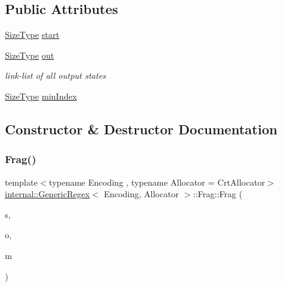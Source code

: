 \subsection*{Public Attributes}
\begin{DoxyCompactItemize}
\item 
\hyperlink{rapidjson_8h_a5ed6e6e67250fadbd041127e6386dcb5}{Size\+Type} \hyperlink{structinternal_1_1GenericRegex_1_1Frag_adec8170ccdf14bfc3138a4df0b2e4abd}{start}
\item 
\hyperlink{rapidjson_8h_a5ed6e6e67250fadbd041127e6386dcb5}{Size\+Type} \hyperlink{structinternal_1_1GenericRegex_1_1Frag_a48b23d866d56328e05c187de2d7443d2}{out}
\begin{DoxyCompactList}\small\item\em link-\/list of all output states \end{DoxyCompactList}\item 
\hyperlink{rapidjson_8h_a5ed6e6e67250fadbd041127e6386dcb5}{Size\+Type} \hyperlink{structinternal_1_1GenericRegex_1_1Frag_a8007c1e6c879d1fe3eec2327fed0c664}{min\+Index}
\end{DoxyCompactItemize}


\subsection{Constructor \& Destructor Documentation}
\mbox{\label{structinternal_1_1GenericRegex_1_1Frag_a377c8d806013ce14ff941be9427e80ff}} 
\subsubsection{\texorpdfstring{Frag()}{Frag()}}
{\footnotesize\ttfamily template$<$typename Encoding , typename Allocator  = Crt\+Allocator$>$ \\
\hyperlink{classinternal_1_1GenericRegex}{internal\+::\+Generic\+Regex}$<$ Encoding, Allocator $>$\+::Frag\+::\+Frag (\begin{DoxyParamCaption}\item[{\hyperlink{rapidjson_8h_a5ed6e6e67250fadbd041127e6386dcb5}{Size\+Type}}]{s,  }\item[{\hyperlink{rapidjson_8h_a5ed6e6e67250fadbd041127e6386dcb5}{Size\+Type}}]{o,  }\item[{\hyperlink{rapidjson_8h_a5ed6e6e67250fadbd041127e6386dcb5}{Size\+Type}}]{m }\end{DoxyParamCaption})\hspace{0.3cm}{\ttfamily [inline]}}



